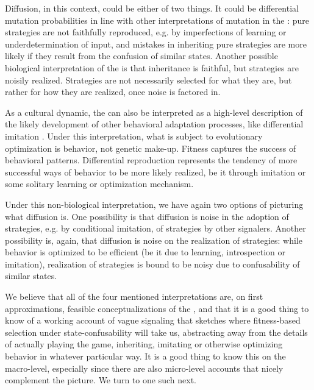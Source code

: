 \documentclass[fleqn,reqno,10pt]{article}
\newcommand{\rd}{\acro{rd}} %
\newcommand{\rmd}{\acro{rmd}} %
\newcommand{\rdd}{\acro{rdd}} %
\begin{document}
Diffusion, in this context, could be either of two things. It could be
differential mutation probabilities in line with other interpretations
of mutation in the \rmd
\citep[e.g.][]{NowakKomarova2001:Evolution-of-Un,KomarovaNiyogi2001:The-Evolutionar}:
pure strategies are not faithfully reproduced, e.g. by imperfections
of learning or underdetermination of input, and mistakes in inheriting
pure strategies are more likely if they result from the confusion of
similar states. Another possible biological interpretation of the
\rdd is that inheritance is faithful, but strategies are noisily
realized. Strategies are not necessarily selected for what they are,
but rather for how they are realized, once noise is factored in.

As a cultural dynamic, the \rd can also be interpreted as a high-level
description of the likely development of other behavioral adaptation
processes, like differential imitation \citep[see][for various
derivations of the \rd]{Sandholm2013:Population-Game}. Under this
interpretation, what is subject to evolutionary optimization is
behavior, not genetic make-up. Fitness captures the success of
behavioral patterns.  Differential reproduction represents the
tendency of more successful ways of behavior to be more likely
realized, be it through imitation or some solitary learning or
optimization mechanism.

Under this non-biological interpretation, we have again two options of
picturing what diffusion is. One possibility is that diffusion is
noise in the adoption of strategies, e.g. by conditional imitation, of
strategies by other signalers. Another possibility is, again, that
diffusion is noise on the realization of strategies: while behavior is
optimized to be efficient (be it due to learning, introspection or
imitation), realization of strategies is bound to be noisy due to
confusability of similar states.

We believe that all of the four mentioned interpretations are, on
first approximations, feasible conceptualizations of the \rdd, and
that it is a good thing to know of a working account of vague
signaling that sketches where fitness-based selection under
state-confusability will take us, abstracting away from the details of
actually playing the game, inheriting, imitating or otherwise
optimizing behavior in whatever particular way. It is a good thing to
know this on the macro-level, especially since there are also
micro-level accounts that nicely complement the picture. We turn to
one such next.
\end{document}
